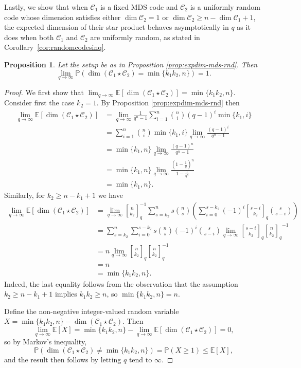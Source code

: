\documentclass[a4paper,11pt,reqno]{article}
\newcommand{\C}{\mathcal{C}}
\newcommand{\qbinom}[2]{\genfrac[]{0pt}{0}{#1}{#2}}
\theoremstyle{plain} \numberwithin{equation}{section}
\newtheorem{proposition}[theorem]{Proposition}
\theoremstyle{definition}
\begin{document}
Lastly, we show that when $\C_1$ is a fixed MDS code and $\C_2$ is a uniformly random code whose dimension satisfies either $\dim \C_2 = 1$ or $\dim \C_2 \ge n - \dim \C_1 + 1$, the expected dimension of their star product behaves asymptotically in $q$ as it does when both $\C_1$ and $\C_2$ are uniformly random, as stated in Corollary~\ref{cor:randomcodesinq}.

\begin{proposition} \label{prop:mdsasymp}
 Let the setup be as in Proposition \ref{prop:expdim-mds-rnd}.
Then 
 $$\lim_{q \rightarrow \infty} \mathbb{P}(  \dim (\C_1\star\C_2) = \min\{k_1k_2, n\}) = 1.$$
\end{proposition}
\begin{proof}
We first show that $\lim_{q\rightarrow \infty}\mathbb{E}[\dim (\C_1\star\C_2)] = \min\{k_1k_2,n\}$. Consider first the case $k_2=1$. By Proposition \ref{prop:expdim-mds-rnd} then
\begin{align*}
    \lim_{q\rightarrow \infty} \mathbb{E}[\dim (\C_1\star\C_2)] &= \lim_{q \rightarrow \infty} 
    \frac{1}{q^n-1} \sum^n_{i=1}\binom{n}{i}(q-1)^{i}\min\{k_1,i\} \\
    &= \sum^{n}_{i=1} \binom{n}{i}\min\{k_1,i\} \lim_{q\rightarrow \infty} \frac{(q-1)^i}{q^n-1} \\
    &= \min\{k_1,n\} \lim_{q\rightarrow \infty} \frac{(q-1)^n}{q^n-1} \\
    &= \min \{k_1,n\} \lim_{q\rightarrow \infty}\frac{(1-\frac{1}{q})^n}{1-\frac{1}{q^n}}\\ 
    &= \min \{k_1,n\}.
\end{align*}
Similarly, for $k_2\geq n-k_1+1$ we have
\begin{align*}
    \lim_{q\rightarrow \infty} \mathbb{E}[\dim (\C_1\star\C_2)] &= \lim_{q\rightarrow \infty}  \qbinom{n}{k_2}^{-1}_q \sum_{s=k_2}^n s\binom{n}{s}\left( \sum_{i=0}^{s-k_2} (-1)^i \qbinom{s-i}{k_2}_q\binom{s}{s - i}\right) \\ 
    &= \sum^{n}_{s=k_2} \sum^{s-k_2}_{i=0} s \binom{n}{s} (-1)^i \binom{s}{s-i} \lim_{q \rightarrow \infty} \qbinom{s-i}{k_2}_q {\qbinom{n}{k_2}_q}^{-1} \\
    &= n \lim_{q\rightarrow \infty} \qbinom{n}{k_2}_q \qbinom{n}{k_2}_q^{-1} \\
    &= n  \\
    &= \min\{k_1k_2,n\}.
\end{align*}
Indeed, the last equality follows from the observation that the assumption 
$k_2 \ge n - k_1 + 1$ implies $k_1k_2 \ge n$, so $\min\{k_1k_2, n\} = n$.

Define the non-negative integer-valued random variable $X = \min\{k_1k_2,n\} - \dim (\C_1\star\C_2)$.
Then
\[
    \lim_{q\rightarrow \infty} \mathbb{E}[X] = \min \{k_1k_2,n\} - \lim_{q\rightarrow \infty}\mathbb{E}[\dim (\C_1\star\C_2)] = 0,
\]
so by Markov's inequality,
\[
    \mathbb{P}(\dim (\C_1\star\C_2) \neq \min\{k_1k_2,n\}) = \mathbb{P}(X \geq 1) \leq \mathbb{E}[X],
\]
and the result then follows by letting $q$ tend to $\infty$.
\end{proof}
\end{document}
